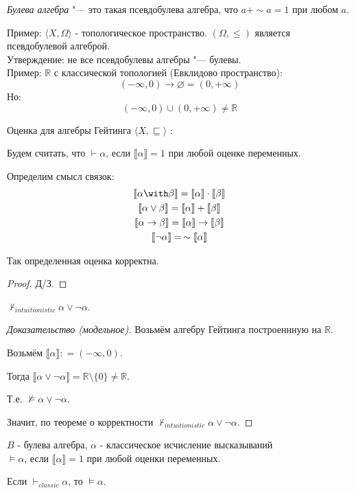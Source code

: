 \begin{definition}
	\emph{Булева алгебра} "--- это такая псевдобулева алгебра, что $ a + \sim a = 1$ при любом $a$.
\end{definition}
Пример:  $\langle{}X, \Omega \rangle$ - топологическое пространство. $(\Omega, \leq)$ является псевдобулевой алгеброй. \\
Утверждение: не все псевдобулевы алгебры "--- булевы. \\
Пример: $\mathbb{R}$ с классической топологией (Евклидово пространство):
\[(-\infty,0) \to \varnothing = (0, +\infty)\]
Но: \[(-\infty,0) \cup  (0, +\infty) \ne \mathbb{R}\]

\begin{definition} Оценка для алгебры Гейтинга $\langle{}X, \sqsubseteq \rangle$ : 
	
	Будем считать, что $\vdash \alpha$, если $ \llbracket \alpha \rrbracket = 1$ при любой оценке переменных. 
	
	Определим смысл связок: 
	\begin{gather*}
	\llbracket \alpha \with \beta \rrbracket = \llbracket \alpha \rrbracket \cdot \llbracket \beta \rrbracket \\
	\llbracket \alpha \vee \beta \rrbracket = \llbracket \alpha \rrbracket + \llbracket \beta \rrbracket \\
	\llbracket \alpha \rightarrow \beta \rrbracket = \llbracket \alpha \rrbracket \rightarrow \llbracket \beta \rrbracket \\
	\llbracket \neg \alpha \rrbracket = \thinspace \sim \llbracket \alpha \rrbracket 
	\end{gather*}

\end{definition}

\begin{theorem}
	Так определенная оценка корректна.
\end{theorem}
\begin{proof}
	Д/З.
\end{proof}
\begin{theorem}
	$ \nvdash_{intuitionistic} \alpha \vee \neg \alpha$.
\end{theorem}
\begin{proof} [Доказательство (модельное)] 
	Возьмём алгебру Гейтинга построеннную на $\mathbb{R}$. 
	
	Возьмём $\llbracket \alpha \rrbracket : = (-\infty, 0)$. 
	
	Тогда $\llbracket \alpha \vee \neg \alpha \rrbracket = \mathbb{R} \setminus \{0\} \neq \mathbb{R} $. 
	
	Т.е. $\nvDash \alpha \vee \neg \alpha$. 
	
	Значит, по теореме о корректности $ \nvdash_{intuitionistic} \alpha \vee \neg \alpha$.
\end{proof}

\begin{definition}
	$B$ - булева алгебра, $\alpha$ - классическое исчисление высказываний \\
	$ \vDash \alpha$, если $ \llbracket \alpha \rrbracket = 1$ при любой оценки переменных.
\end{definition}

\begin{theorem}
	Если $\vdash_{classic} \alpha$, то 	$ \vDash \alpha$.
\end{theorem}